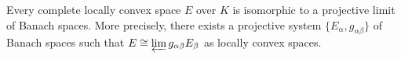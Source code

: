 Every complete locally convex space $E$ over $K$ is isomorphic to a projective limit of Banach spaces. More precisely, there exists a projective system $\{E_\alpha, g_{\alpha\beta}\}$ of Banach spaces such that $E \cong \varprojlim g_{\alpha\beta} E_\beta$ as locally convex spaces.
